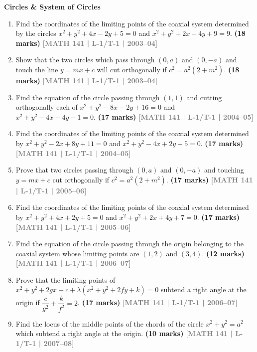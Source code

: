 \documentclass[12pt,a4paper]{article}
\newcommand{\yr}[1]{\hfill\textcolor{gray}{\small\textbf{[#1]}}}
\newcommand{\mk}[1]{\textcolor{orange!70!black}{\small\textbf{(#1 marks)}}}
\newcommand{\subtopic}[2]{%
  \vspace{10pt}
  \noindent\begin{tcolorbox}[colback=#1!8,colframe=#1,boxrule=0.6pt,arc=4pt,
    left=6pt,right=6pt,top=4pt,bottom=4pt]
    \small\bfseries\textcolor{#1}{#2}
  \end{tcolorbox}
  \vspace{2pt}
}
\begin{document}
\subtopic{cH}{Circles \& System of Circles}
\label{sub:s10-circles}

\begin{enumerate}

\item Find the coordinates of the limiting points of the coaxial system determined by the circles $x^{2}+y^{2}+4x-2y+5=0$ and $x^{2}+y^{2}+2x+4y+9=9$.
\mk{18} \yr{MATH 141 | L-1/T-1 | 2003--04}

\item Show that the two circles which pass through $(0,a)$ and $(0,-a)$ and touch the line $y=mx+c$ will cut orthogonally if $c^{2}=a^{2}(2+m^{2})$.
\mk{18} \yr{MATH 141 | L-1/T-1 | 2003--04}

\item Find the equation of the circle passing through $(1,1)$ and cutting orthogonally each of $x^{2}+y^{2}-8x-2y+16=0$ and $x^{2}+y^{2}-4x-4y-1=0$.
\mk{17} \yr{MATH 141 | L-1/T-1 | 2004--05}

\item Find the coordinates of the limiting points of the coaxial system determined by $x^{2}+y^{2}-2x+8y+11=0$ and $x^{2}+y^{2}-4x+2y+5=0$.
\mk{17} \yr{MATH 141 | L-1/T-1 | 2004--05}

\item Prove that two circles passing through $(0,a)$ and $(0,-a)$ and touching $y=mx+c$ cut orthogonally if $c^{2}=a^{2}(2+m^{2})$.
\mk{17} \yr{MATH 141 | L-1/T-1 | 2005--06}

\item Find the coordinates of the limiting points of the coaxial system determined by $x^{2}+y^{2}+4x+2y+5=0$ and $x^{2}+y^{2}+2x+4y+7=0$.
\mk{17} \yr{MATH 141 | L-1/T-1 | 2005--06}

\item Find the equation of the circle passing through the origin belonging to the coaxial system whose limiting points are $(1,2)$ and $(3,4)$.
\mk{12} \yr{MATH 141 | L-1/T-1 | 2006--07}

\item Prove that the limiting points of $x^{2}+y^{2}+2gx+c+\lambda(x^{2}+y^{2}+2fy+k)=0$ subtend a right angle at the origin if $\dfrac{c}{g^{2}}+\dfrac{k}{f^{2}}=2$.
\mk{17} \yr{MATH 141 | L-1/T-1 | 2006--07}

\item Find the locus of the middle points of the chords of the circle $x^{2}+y^{2}=a^{2}$ which subtend a right angle at the origin.
\mk{10} \yr{MATH 141 | L-1/T-1 | 2007--08}


\end{enumerate}
\end{document}
